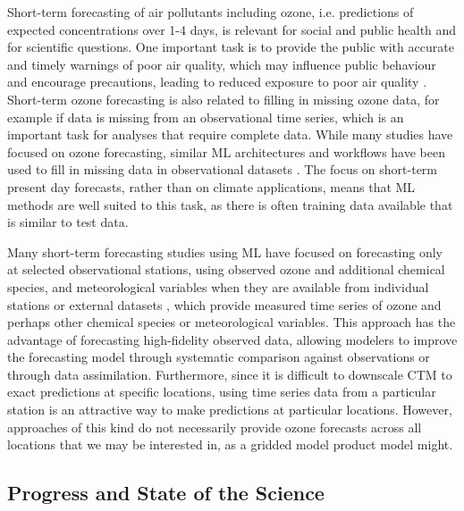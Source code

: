 \documentclass[gmd, manuscript]{copernicus}
\begin{document}
Short-term forecasting of air pollutants including ozone, i.e. predictions of expected concentrations over 1-4 days, is relevant for social and public health and for scientific questions. One important task is to provide the public with accurate and timely warnings of poor air quality, which may influence public behaviour and encourage precautions, leading to reduced exposure to poor air quality \citep{Buonocore2021, Hahm2021,Alari2021, Saberian2017}. Short-term ozone forecasting is also related to filling in missing ozone data, for example if data is missing from an observational time series, which is an important task for analyses that require complete data. While many studies have focused on ozone forecasting, similar ML architectures and workflows have been used to fill in missing data in observational datasets \citep{betancourt_global_2022, Wu2024}. The focus on short-term present day forecasts, rather than on climate applications, means that ML methods are well suited to this task, as there is often training data available that is similar to test data. 

Many short-term forecasting studies using ML have focused on forecasting only at selected observational stations, using observed ozone and additional chemical species, and meteorological variables when they are available from individual stations or external datasets \cite{Comrie1997, cobourn_comparison_2000, Kolehmainen2001,Eslami2020, sayeed_novel_2021, leufen_o3resnet_2023, Hickman2023}, which provide measured time series of ozone and perhaps other chemical species or meteorological variables. This approach has the advantage of forecasting high-fidelity observed data, allowing modelers to improve the forecasting model through systematic comparison against observations or through data assimilation. Furthermore, since it is difficult to downscale CTM to exact predictions at specific locations, using time series data from a particular station is an attractive way to make predictions at particular locations. However, approaches of this kind do not necessarily provide ozone forecasts across all locations that we may be interested in, as a gridded model product model might.

\subsection{Progress and State of the Science}
\end{document}
